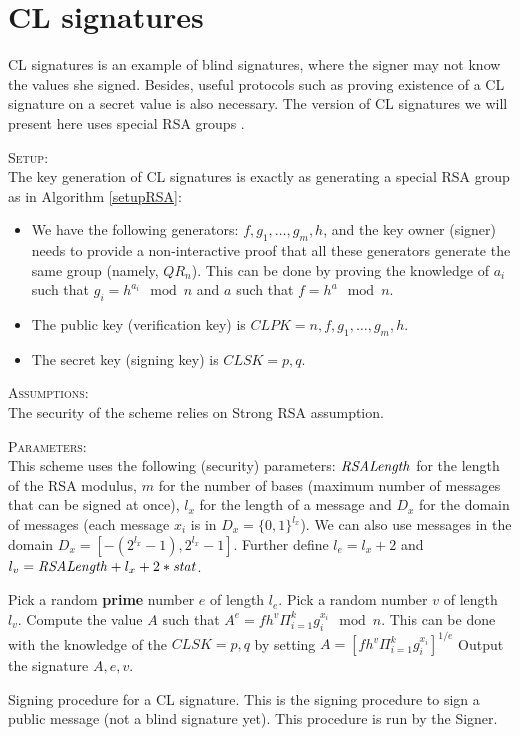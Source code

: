 \section{CL signatures}

CL signatures is an example of blind signatures, where the signer may not know the values she signed. Besides, useful protocols such as proving existence of a CL signature on a secret value is also necessary. The version of CL signatures we will present here uses special RSA groups \cite{cl1,cl2,cgCL,bcl}.


\textsc{Setup}:\\
The key generation of CL signatures is exactly as generating a special RSA group as in Algorithm \ref{setupRSA}:
\begin{itemize}
\item We have the following generators: $f,g_1,\ldots,g_m,h$, and the key owner (signer) needs to provide a non-interactive proof that all these generators generate the same group (namely, $QR_n$). This can be done by proving the knowledge of $a_i$ such that $g_i = h^{a_i} \mod n$ and $a$ such that $f = h^a \mod n$.
\item The public key (\ie verification key) is $CLPK = n,f,g_1,\ldots,g_m,h$.
\item The secret key (\ie signing key) is $CLSK = p,q$.
\end{itemize}


\textsc{Assumptions}:\\
The security of the scheme relies on Strong RSA assumption.


\textsc{Parameters}:\\
This scheme uses the following (security) parameters: $\mathit{RSALength}$ for the length of the RSA modulus, $m$ for the number of bases (maximum number of messages that can be signed at once), $l_x$ for the length of a message and $D_x$ for the domain of messages (each message $x_i$ is in $D_x = \{0,1\}^{l_x}$). We can also use messages in the domain $D_x = [-(2^{l_x}-1) , 2^{l_x}-1]$. Further define $l_e = l_x + 2$ and $l_v = \mathit{RSALength} + l_x + 2*\mathit{stat}$.


\begin{algorithm}[H]\label{signCL}
\dontprintsemicolon

\BlankLine

 \;
\Indp
  Pick a random \textbf{prime} number $e$ of length $l_e$. \;
  Pick a random number $v$ of length $l_v$. \;
  Compute the value $A$ such that $A^e = f h^v \Pi_{i = 1}^{k} g_{i}^{x_i} \mod n$. This can be done with the knowledge of the $CLSK = p,q$ by setting $A = [ f h^v \Pi_{i = 1}^{k} g_{i}^{x_i} ]^{1/e}$ \;
  Output the signature $A,e,v$. \;
\Indm

\caption{Signing procedure for a CL signature. This is the signing procedure to sign a public message (not a blind signature yet). This procedure is run by the Signer.}
\end{algorithm}


